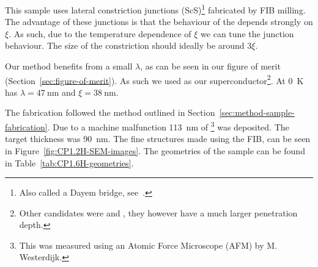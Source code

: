 This sample uses lateral constriction junctions (ScS)\footnote{Also called a Dayem bridge, see~\cite{likharevSuperconductingWeakLinks1979}.} fabricated by FIB milling. The advantage of these junctions is that the behaviour of the depends strongly on $\xi$.\cite{likharevSuperconductingWeakLinks1979} As such, due to the temperature dependence of $\xi$ we can tune the junction behaviour. The size of the constriction should ideally be around $3\xi$.\cite{likharevSuperconductingWeakLinks1979}

Our method benefits from a small $\lambda$, as can be seen in our figure of merit (Section~\ref{sec:figure-of-merit}). As such we used  as our superconductor\footnote{Other candidates were  and , they however have a much larger penetration depth.}. At \qty{0}{\kelvin}  has $\lambda = \qty{47}{\nano\meter}$ and $\xi = \qty{38}{\nano\meter}$.\cite{maxfieldSuperconductingPenetrationDepth1965}

The fabrication followed the method outlined in Section~\ref{sec:method-sample-fabrication}. Due to a machine malfunction \qty{113}{\nano\meter} of \footnote{This was measured using an Atomic Force Microscope (AFM) by M. Westerdijk.} was deposited. The target thickness was \qty{90}{\nano\meter}. The fine structures made using the FIB, can be seen in Figure~\ref{fig:CP1.2H-SEM-images}. The geometries of the sample can be found in Table~\ref{tab:CP1.6H-geometries}.

